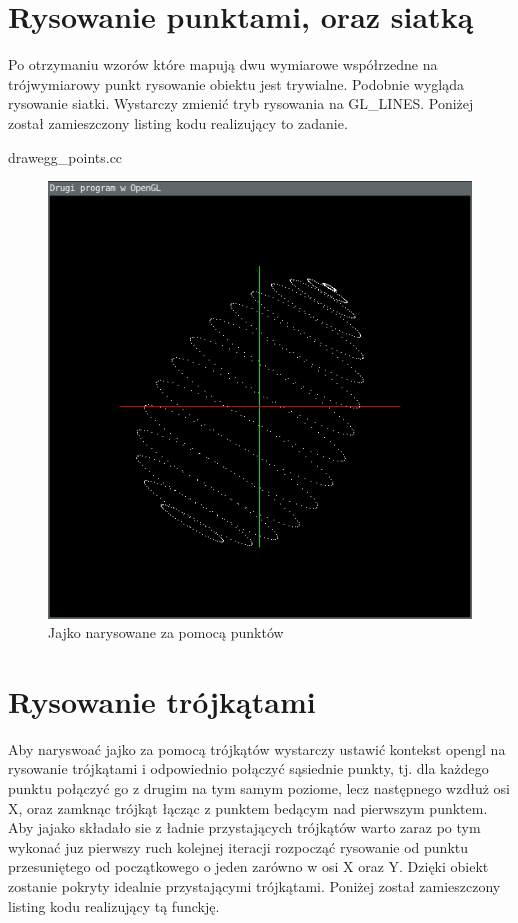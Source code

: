 \documentclass[polish,polish,a4paper]{report}
\begin{document}
\section{Rysowanie punktami, oraz siatką}
Po otrzymaniu wzorów które mapują dwu wymiarowe współrzedne na trójwymiarowy punkt rysowanie obiektu jest trywialne.
Podobnie wygląda rysowanie siatki. Wystarczy zmienić tryb rysowania na GL\_LINES.
Poniżej został zamieszczony listing
kodu realizujący to zadanie.


{drawegg_points.cc}

\pagebreak

\begin{figure}[!htb]
\begin{center}
\includegraphics[width=\textwidth]{eggpoints}
\caption{Jajko narysowane za pomocą punktów}
\end{center}
\end{figure}

\pagebreak

\section{Rysowanie trójkątami}
Aby naryswoać jajko za pomocą trójkątów wystarczy ustawić kontekst opengl na rysowanie trójkątami i odpowiednio połączyć sąsiednie punkty, tj.
dla każdego punktu połączyć go z drugim na tym samym poziome, lecz następnego wzdłuż osi X, oraz zamknąc trójkąt łącząc z punktem bedącym nad pierwszym
punktem. Aby jajako składało sie z ładnie przystających trójkątów warto zaraz po tym wykonać juz pierwszy ruch kolejnej iteracji rozpocząć rysowanie
od punktu przesuniętego od początkowego o jeden zarówno w osi X oraz Y. Dzięki obiekt zostanie pokryty idealnie przystającymi trójkątami.
Poniżej został zamieszczony listing kodu realizujący tą funckję.
\end{document}
